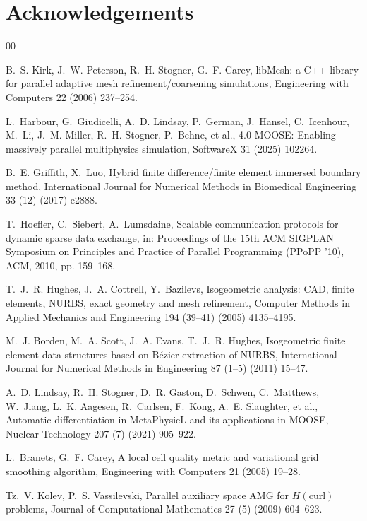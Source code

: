 \documentclass[preprint,12pt, a4paper]{elsarticle}
\begin{document}
\section*{Acknowledgements}

\begin{thebibliography}{00}

 B.~S. Kirk, J.~W. Peterson, R.~H. Stogner, G.~F. Carey, libMesh: a C++
library for parallel adaptive mesh refinement/coarsening simulations, Engineering with Computers
22 (2006) 237--254.

 L.~Harbour, G.~Giudicelli, A.~D. Lindsay, P.~German, J.~Hansel,
C.~Icenhour, M.~Li, J.~M. Miller, R.~H. Stogner, P.~Behne, et al., 4.0 MOOSE: Enabling massively
parallel multiphysics simulation, SoftwareX 31 (2025) 102264.

 B.~E. Griffith, X.~Luo, Hybrid finite difference/finite element
immersed boundary method, International Journal for Numerical Methods in Biomedical Engineering
33 (12) (2017) e2888.

 T.~Hoefler, C.~Siebert, A.~Lumsdaine, Scalable communication protocols for
dynamic sparse data exchange, in: Proceedings of the 15th ACM SIGPLAN Symposium on Principles and
Practice of Parallel Programming (PPoPP '10), ACM, 2010, pp. 159--168.

 T.~J.~R. Hughes, J.~A. Cottrell, Y.~Bazilevs, Isogeometric analysis: CAD,
finite elements, NURBS, exact geometry and mesh refinement, Computer Methods in Applied Mechanics
and Engineering 194 (39--41) (2005) 4135--4195.

 M.~J. Borden, M.~A. Scott, J.~A. Evans, T.~J.~R. Hughes, Isogeometric
finite element data structures based on B\'ezier extraction of NURBS, International Journal for
Numerical Methods in Engineering 87 (1--5) (2011) 15--47.

 A.~D. Lindsay, R.~H. Stogner, D.~R. Gaston, D.~Schwen,
C.~Matthews, W.~Jiang, L.~K. Aagesen, R.~Carlsen, F.~Kong, A.~E. Slaughter, et al., Automatic
differentiation in MetaPhysicL and its applications in MOOSE, Nuclear Technology 207 (7) (2021)
905--922.

 L.~Branets, G.~F. Carey, A local cell quality metric and
variational grid smoothing algorithm, Engineering with Computers 21 (2005) 19--28.

 Tz.~V. Kolev, P.~S. Vassilevski, Parallel auxiliary space AMG for
$H(\mathrm{curl})$ problems, Journal of Computational Mathematics 27 (5) (2009) 604--623.


\end{thebibliography}
\end{document}
